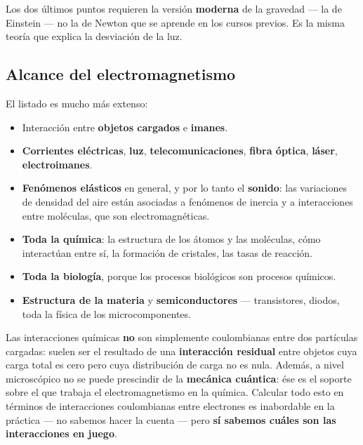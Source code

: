 \documentclass[12pt,a4paper]{article}
\begin{document}
\begin{notebox}
Los dos últimos puntos requieren la versión \textbf{moderna} de la gravedad ---
la de Einstein --- no la de Newton que se aprende en los cursos previos. Es la
misma teoría que explica la desviación de la luz.
\end{notebox}

\subsection{Alcance del electromagnetismo}

El listado es mucho más extenso:

\begin{itemize}
  \item Interacción entre \textbf{objetos cargados} e \textbf{imanes}.
  \item \textbf{Corrientes eléctricas}, \textbf{luz},
        \textbf{telecomunicaciones}, \textbf{fibra óptica}, \textbf{láser},
        \textbf{electroimanes}.
  \item \textbf{Fenómenos elásticos} en general, y por lo tanto el
        \textbf{sonido}: las variaciones de densidad del aire están asociadas a
        fenómenos de inercia y a interacciones entre moléculas, que son
        electromagnéticas.
  \item \textbf{Toda la química}: la estructura de los átomos y las moléculas,
        cómo interactúan entre sí, la formación de cristales, las tasas de
        reacción.
  \item \textbf{Toda la biología}, porque los procesos biológicos son procesos
        químicos.
  \item \textbf{Estructura de la materia} y \textbf{semiconductores} ---
        transistores, diodos, toda la física de los microcomponentes.
\end{itemize}

\begin{warnbox}
Las interacciones químicas \textbf{no} son simplemente coulombianas entre dos
partículas cargadas: suelen ser el resultado de una \textbf{interacción
residual} entre objetos cuya carga total es cero pero cuya distribución de carga
no es nula. Además, a nivel microscópico no se puede prescindir de la
\textbf{mecánica cuántica}: ése es el soporte sobre el que trabaja el
electromagnetismo en la química. Calcular todo esto en términos de interacciones
coulombianas entre electrones es inabordable en la práctica --- no sabemos hacer
la cuenta --- pero \textbf{sí sabemos cuáles son las interacciones en juego}.
\end{warnbox}
\end{document}
